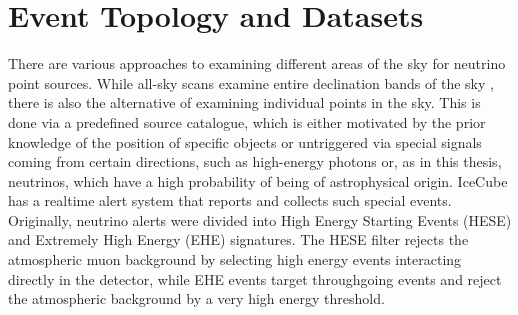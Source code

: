 \chapter{Event Topology and Datasets} \label{sec:events_data}

%

There are various approaches to examining different areas of the sky for neutrino point sources.
While all-sky scans examine entire declination bands of the sky \cite{all_sky_paper}, there is also the alternative of examining individual points in the sky.
This is done via a predefined source catalogue, which is either motivated by the prior knowledge of the position of specific objects or untriggered via special signals coming from certain directions, such as high-energy photons or, as in this thesis, neutrinos, which have a high probability of being of astrophysical origin.
IceCube has a realtime alert system that reports and collects such special events.
Originally, neutrino alerts were divided into High Energy Starting Events (HESE) and Extremely High Energy (EHE) signatures.
The HESE filter rejects the atmospheric muon background by selecting high energy events interacting directly in the detector, while EHE events target throughgoing events and reject the atmospheric background by a very high energy threshold.

